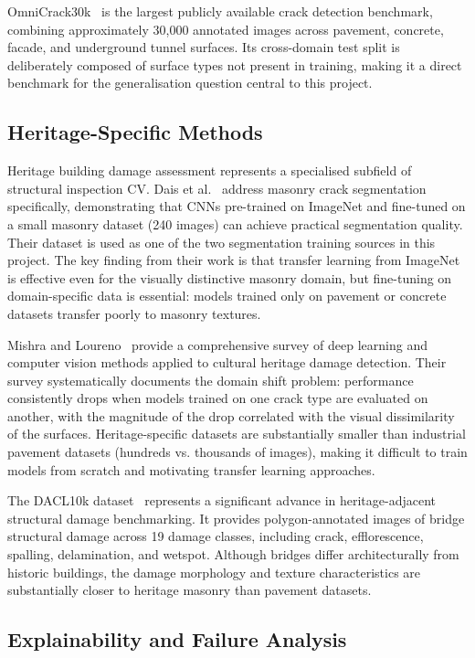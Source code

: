 \documentclass[12pt,a4paper]{article}
\begin{document}
OmniCrack30k~\cite{omnicrack} is the largest publicly available crack detection benchmark, combining approximately 30,000 annotated images across pavement, concrete, facade, and underground tunnel surfaces. Its cross-domain test split is deliberately composed of surface types not present in training, making it a direct benchmark for the generalisation question central to this project.

\subsection{Heritage-Specific Methods}

Heritage building damage assessment represents a specialised subfield of structural inspection CV. Dais et al.~\cite{dais2021} address masonry crack segmentation specifically, demonstrating that CNNs pre-trained on ImageNet and fine-tuned on a small masonry dataset (240 images) can achieve practical segmentation quality. Their dataset is used as one of the two segmentation training sources in this project. The key finding from their work is that transfer learning from ImageNet is effective even for the visually distinctive masonry domain, but fine-tuning on domain-specific data is essential: models trained only on pavement or concrete datasets transfer poorly to masonry textures.

Mishra and Loureno~\cite{mishra2024} provide a comprehensive survey of deep learning and computer vision methods applied to cultural heritage damage detection. Their survey systematically documents the domain shift problem: performance consistently drops when models trained on one crack type are evaluated on another, with the magnitude of the drop correlated with the visual dissimilarity of the surfaces. Heritage-specific datasets are substantially smaller than industrial pavement datasets (hundreds vs. thousands of images), making it difficult to train models from scratch and motivating transfer learning approaches.

The DACL10k dataset~\cite{dacl10k} represents a significant advance in heritage-adjacent structural damage benchmarking. It provides polygon-annotated images of bridge structural damage across 19 damage classes, including crack, efflorescence, spalling, delamination, and wetspot. Although bridges differ architecturally from historic buildings, the damage morphology and texture characteristics are substantially closer to heritage masonry than pavement datasets.

\subsection{Explainability and Failure Analysis}
\end{document}

